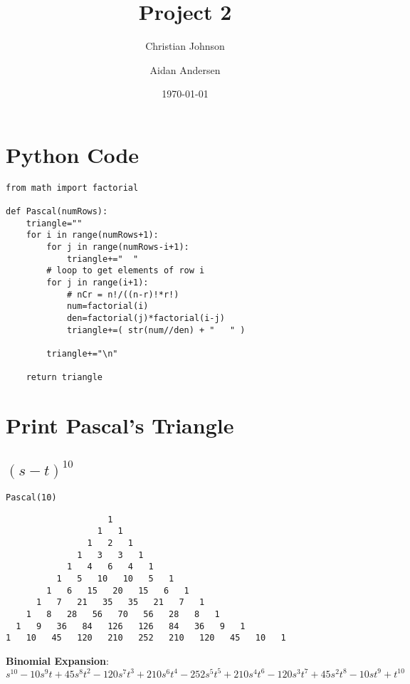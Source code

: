 \documentclass[11pt]{article}
\author{Christian Johnson \and Aidan Andersen}
\date{\today}
\title{Project 2}
\begin{document}
\maketitle
\tableofcontents

\newpage



\section{Python Code}
\label{sec:org6f1422e}
\begin{verbatim}
from math import factorial

def Pascal(numRows):
    triangle=""
    for i in range(numRows+1):
        for j in range(numRows-i+1):
            triangle+="  "
        # loop to get elements of row i
        for j in range(i+1):
            # nCr = n!/((n-r)!*r!)
            num=factorial(i)
            den=factorial(j)*factorial(i-j)
            triangle+=( str(num//den) + "   " )

        triangle+="\n"

    return triangle
\end{verbatim}

\section{Print Pascal's Triangle}
\label{sec:org2f84fe7}

\subsection{\((s-t)^{10}\)}
\label{sec:orged03795}

\begin{verbatim}
Pascal(10)
\end{verbatim}

\begin{verbatim}
                    1   
                  1   1   
                1   2   1   
              1   3   3   1   
            1   4   6   4   1   
          1   5   10   10   5   1   
        1   6   15   20   15   6   1   
      1   7   21   35   35   21   7   1   
    1   8   28   56   70   56   28   8   1   
  1   9   36   84   126   126   84   36   9   1   
1   10   45   120   210   252   210   120   45   10   1   
\end{verbatim}

\textbf{Binomial Expansion}:
\(s^{10}-10s^{9}t+45s^{8}t^2-120s^7t^3+210s^6t^4-252s^5t^5+210s^4t^6-120s^3t^7+45s^2t^8-10st^9+t^{10}\)
\end{document}
